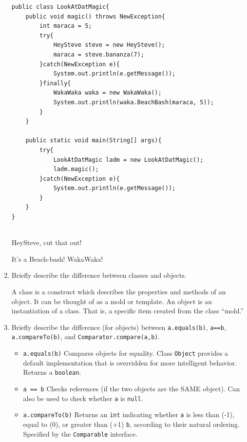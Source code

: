 \documentclass[11pt]{article}
\newenvironment{answer}{\large\lstset{basicstyle=\tiny\ttfamily}\color{white}}{}
\newenvironment{answer}{\large\lstset{basicstyle=\large\ttfamily}\color{red}}{}
\begin{document}
\begin{enumerate}
\begin{lstlisting}
public class LookAtDatMagic{
    public void magic() throws NewException{
        int maraca = 5;
        try{
            HeySteve steve = new HeySteve();
            maraca = steve.bananza(7);
        }catch(NewException e){
            System.out.println(e.getMessage());
        }finally{
            WakaWaka waka = new WakaWaka();
            System.out.println(waka.BeachBash(maraca, 5));
        }
    }

    public static void main(String[] args){
        try{
            LookAtDatMagic ladm = new LookAtDatMagic();
            ladm.magic();
        }catch(NewException e){
            System.out.println(e.getMessage());
        }
    }
}


\end{lstlisting}
\begin{answer}
HeySteve, cut that out!


It's a Beach-bash! WakaWaka!
\end{answer}
\pagebreak
\item Briefly describe the difference between classes and objects.

    \begin{answer}
    A class is a construct which describes the properties and methods of an
    object. It can be thought of as a mold or template. An object is an 
    instantiation of a class. That is, a specific item created from the class
    ``mold.''
    \end{answer}

\vspace{32pt}
\item Briefly describe the difference (for objects) between \texttt{a.equals(b)}, \texttt{a==b},
      \texttt{a.compareTo(b)}, and \texttt{Comparator.compare(a,b)}.

    \begin{answer}
    \begin{itemize}

    \item \texttt{a.equals(b)} Compares objects for equality. Class \texttt{Object} provides a default implementation
	that is overridden for more intelligent behavior.
    Returns a \texttt{boolean}.

    \item \texttt{a == b}  Checks references (if the two objects are the SAME object).
    Can also be used to check whether \texttt{a} is \texttt{null}.

    \item \texttt{a.compareTo(b)} Returns an \texttt{int} indicating whether \texttt{a} is less than (-1),
    equal to (0), or greater than (+1) \texttt{b}, according to their natural ordering.
	Specified by the \texttt{Comparable} interface.


\end{itemize}
\end{answer}
\end{enumerate}
\end{document}
